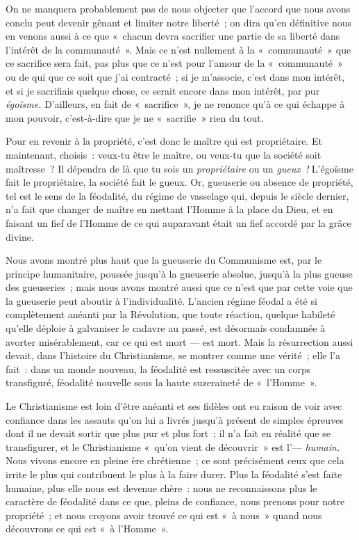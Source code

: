 \documentclass[french,twoside]{book} %
\begin{document}
On ne manquera probablement pas de nous objecter que l’accord que nous avons conclu peut devenir gênant et limiter notre liberté ; on dira qu’en définitive nous en venons aussi à ce que « chacun devra sacrifier une partie de sa liberté dans l’intérêt de la communauté ». Mais ce n’est nullement à la « communauté » que ce sacrifice sera fait, pas plus que ce n’est pour l’amour de la « communauté » ou de qui que ce soit que j’ai contracté ; si je m’associe, c’est dans mon intérêt, et si je sacrifiais quelque chose, ce serait encore dans mon intérêt, par pur \emph{égoïsme. }D’ailleurs, en fait de « sacrifice », je ne renonce qu’à ce qui échappe à mon pouvoir, c’est-à-dire que je ne « sacrifie » rien du tout.\par
Pour en revenir à la propriété, c’est donc le maître qui est propriétaire. Et maintenant, choisis : veux-tu être le maître, ou veux-tu que la société soit maîtresse ? Il dépendra de là que tu sois un \emph{propriétaire }ou un \emph{gueux !} L’égoïsme fait le propriétaire, la société fait le gueux. Or, gueuserie ou absence de propriété, tel est le sens de la féodalité, du régime de vasselage qui, depuis le siècle dernier, n’a fait que changer de maître en mettant l’Homme à la place du Dieu, et en faisant un fief de l’Homme de ce qui auparavant  était un fief accordé par la grâce divine.\par
Nous avons montré plus haut que la gueuserie du Communisme est, par le principe humanitaire, poussée jusqu’à la gueuserie absolue, jusqu’à la plus gueuse des gueuseries ; mais nous avons montré aussi que ce n’est que par cette voie que la gueuserie peut aboutir à l’individualité. L’ancien régime féodal a été si complètement anéanti par la Révolution, que toute réaction, quelque habileté qu’elle déploie à galvaniser le cadavre au passé, est désormais condamnée à avorter misérablement, car ce qui est mort — est mort. Mais la résurrection aussi devait, dans l’histoire du Christianisme, se montrer comme une vérité ; elle l’a fait : dans un monde nouveau, la féodalité est ressuscitée avec un corps transfiguré, féodalité nouvelle sous la haute suzeraineté de « l’Homme ».\par
Le Christianisme est loin d’être anéanti et ses fidèles ont eu raison de voir avec confiance dans les assauts qu’on lui a livrés jusqu’à présent de simples épreuves dont il ne devait sortir que plus pur et plus fort ; il n’a fait en réalité que se transfigurer, et le Christianisme « qu’on vient de découvrir » est l’— \emph{humain. }Nous vivons encore en pleine ère chrétienne ; ce sont précisément ceux que cela irrite le plus qui contribuent le plus à la faire durer. Plus la féodalité s’est faite humaine, plus elle nous est devenue chère : nous ne reconnaissons plus le caractère de féodalité dans ce que, pleins de confiance, nous prenons pour notre propriété ; et nous croyons avoir trouvé ce qui est « à nous » quand nous découvrons ce qui est « à l’Homme ».\par
\end{document}
